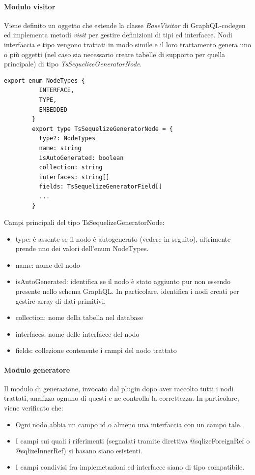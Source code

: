 \documentclass[a4paper, 12pt]{report}
\begin{document}
      \paragraph*{Modulo visitor}
      Viene definito un oggetto che estende la classe \emph{BaseVisitor} di GraphQL-codegen ed implementa metodi \emph{visit} per gestire definizioni di tipi ed interfacce.
      Nodi interfaccia e tipo vengono trattati in modo simile e il loro trattamento genera uno o più oggetti (nel caso sia necessario creare tabelle di supporto per quella principale) di tipo \emph{TsSequelizeGeneratorNode}.
      \begin{Verbatim}[samepage=true]
        export enum NodeTypes {
          INTERFACE,
          TYPE,
          EMBEDDED
        }
        export type TsSequelizeGeneratorNode = {
          type?: NodeTypes
          name: string
          isAutoGenerated: boolean
          collection: string
          interfaces: string[]
          fields: TsSequelizeGeneratorField[]
          ...
        }       
      \end{Verbatim}
      Campi principali del tipo TsSequelizeGeneratorNode:
      \begin{itemize}
        \item type: è assente se il nodo è autogenerato (vedere in seguito), altrimente prende uno dei valori dell'enum NodeTypes.
        \item name: nome del nodo
        \item isAutoGenerated: identifica se il nodo è stato aggiunto pur non essendo presente nello schema GraphQL. In particolare, identifica i nodi creati per gestire array di dati primitivi.
        \item collection: nome della tabella nel database
        \item interfaces: nome delle interfacce del nodo
        \item fields: collezione contenente i campi del nodo trattato
      \end{itemize}
      \newpage
      \paragraph*{Modulo generatore}
      Il modulo di generazione, invocato dal plugin dopo aver raccolto tutti i nodi trattati, analizza ognuno di questi e ne controlla la correttezza.
      In particolare, viene verificato che:
      \begin{itemize}
        \item Ogni nodo abbia un campo id o almeno una interfaccia con un campo tale.
        \item I campi sui quali i riferimenti (segnalati tramite direttiva @sqlizeForeignRef o @sqlizeInnerRef) si basano siano esistenti.
        \item I campi condivisi fra implemetazioni ed interfacce siano di tipo compatibile.
      \end{itemize}
\end{document}
